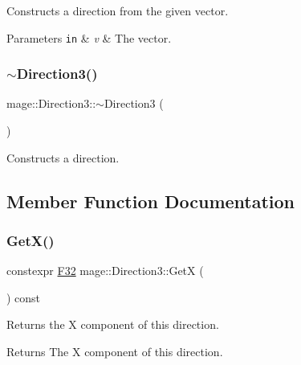 Constructs a direction from the given vector.


\begin{DoxyParams}[1]{Parameters}
\mbox{\tt in}  & {\em v} & The vector. \\
\hline
\end{DoxyParams}
\mbox{\label{structmage_1_1_direction3_a583c087dc366d206aaf54a33bc90c50b}} 
\subsubsection{\texorpdfstring{$\sim$\+Direction3()}{~Direction3()}}
{\footnotesize\ttfamily mage\+::\+Direction3\+::$\sim$\+Direction3 (\begin{DoxyParamCaption}{ }\end{DoxyParamCaption})\hspace{0.3cm}{\ttfamily [default]}}

Constructs a direction. 

\subsection{Member Function Documentation}
\mbox{\label{structmage_1_1_direction3_a8d3ec6086f1b47844331950df3a47207}} 
\subsubsection{\texorpdfstring{Get\+X()}{GetX()}}
{\footnotesize\ttfamily constexpr \mbox{\hyperlink{namespacemage_aa97e833b45f06d60a0a9c4fc22ae02c0}{F32}} mage\+::\+Direction3\+::\+GetX (\begin{DoxyParamCaption}{ }\end{DoxyParamCaption}) const\hspace{0.3cm}{\ttfamily [noexcept]}}

Returns the X component of this direction.

\begin{DoxyReturn}{Returns}
The X component of this direction. 
\end{DoxyReturn}
\mbox{\label{structmage_1_1_direction3_a995bc58846a268b63f6e7fdd678420cd}} 
